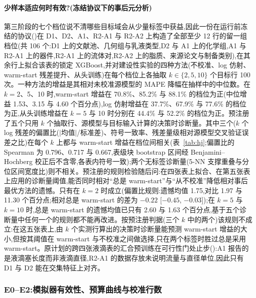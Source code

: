 \documentclass[11pt,a4paper]{ctexart}
\begin{document}
\paragraph{少样本适应何时有效?(冻结协议下的事后元分析)} 第三阶段的七个档位说不清哪些目标域会从少量标签中获益,因此一份在运行前冻结的协议()在 D1、D2、A1、R2-A1 与 R2-A2 上构造了全部至少 12 行的留一组档位(共 106 个:D1 上的文献池、几何组与乳液类型,D2 与 A1 上的化学组,A1 与 R2-A1 上的器件,R2-A1 上的流体对,R2-A2 上的脂质、来源论文与制备类别),在其余行上拟合该表的锁定 XGBoost,并对建设性实验的四种方法(不校准、log 仿射、warm-start 残差提升、从头训练)在每个档位上各抽取 $k\in\{2,5,10\}$ 个目标行 100 次。一种方法的增益是其相对未校准源模型的 MAPE 降幅在抽样中的中位数。在 $k=2$、5、10 时,warm-start 增益在 70.8\%、85.2\% 与 88.1\% 的档位为正(中位增益 1.53、3.15 与 4.60 个百分点),log 仿射增益在 37.7\%、67.9\% 与 77.6\% 的档位为正,从头训练增益在 $k=5$ 与 10 时分别在 44.4\% 与 52.2\% 的档位为正。预注册了五个只用 $k$ 个抽取行、源模型与目标输入计算的决策时诊断量。其中三个($k$ 个 log 残差的偏置比($|$均值$|$/标准差)、符号一致率、残差量级相对源模型交叉验证误差之比)在每个 $k$ 上都与 warm-start 增益在档位间相关(表~\ref{tab:hj};偏置比的 Spearman 为 0.796、0.717 与 0.667,表级块 bootstrap 区间经 Benjamini--Hochberg 校正后不含零,各表内符号一致);两个无标签诊断量(5-NN 支撑重叠与分位区间宽度比)则不相关。预注册的规则检验随后问:在四张表上拟合、在第五张表上应用的诊断量阈值,能否同时相对“总是 warm-start”与“从不校准”降低相对事后最优方法的遗憾。只有在 $k=2$ 时成立(偏置比规则:遗憾均值 1.75,对比 1.97 与 11.30 个百分点;相对总是 warm-start 的差为 $-0.22$ [$-0.45$, $-0.03$]);在 $k=5$ 与 $k=10$ 时,总是 warm-start 的遗憾均值已只有 2.60 与 1.63 个百分点,基于五个诊断量中任何一个的规则都不能再改进。按预注册判据(三个 $k$ 中的两个)该规则不成立:在这五张表上,由 $k$ 个实测行算出的决策时诊断量能预测 warm-start 增益的大小,但按其阈值在 warm-start 与不校准之间做选择,只在两个标签时胜过总是采用 warm-start。原计划的跨四张液滴表的汇合预训练在可行性门处止步():A1 报告的是液滴塞长度而非液滴直径,R2-A1 的数据存放未说明流量与直径单位,因此只有 D1 与 D2 能在交集特征上对齐。

\subsubsection{E0--E2:模拟器有效性、预算曲线与校准行数}
\label{sec:e2}
\end{document}
